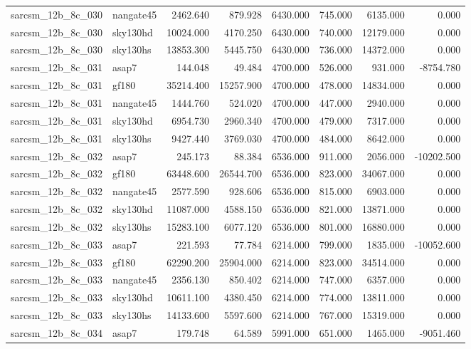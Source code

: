 \begin{tabular}{llrrrrrr}
sarcsm\_12b\_8c\_030 & nangate45 & 2462.640 & 879.928 & 6430.000 & 745.000 & 6135.000 & 0.000 \\
sarcsm\_12b\_8c\_030 & sky130hd & 10024.000 & 4170.250 & 6430.000 & 740.000 & 12179.000 & 0.000 \\
sarcsm\_12b\_8c\_030 & sky130hs & 13853.300 & 5445.750 & 6430.000 & 736.000 & 14372.000 & 0.000 \\
sarcsm\_12b\_8c\_031 & asap7 & 144.048 & 49.484 & 4700.000 & 526.000 & 931.000 & -8754.780 \\
sarcsm\_12b\_8c\_031 & gf180 & 35214.400 & 15257.900 & 4700.000 & 478.000 & 14834.000 & 0.000 \\
sarcsm\_12b\_8c\_031 & nangate45 & 1444.760 & 524.020 & 4700.000 & 447.000 & 2940.000 & 0.000 \\
sarcsm\_12b\_8c\_031 & sky130hd & 6954.730 & 2960.340 & 4700.000 & 479.000 & 7317.000 & 0.000 \\
sarcsm\_12b\_8c\_031 & sky130hs & 9427.440 & 3769.030 & 4700.000 & 484.000 & 8642.000 & 0.000 \\
sarcsm\_12b\_8c\_032 & asap7 & 245.173 & 88.384 & 6536.000 & 911.000 & 2056.000 & -10202.500 \\
sarcsm\_12b\_8c\_032 & gf180 & 63448.600 & 26544.700 & 6536.000 & 823.000 & 34067.000 & 0.000 \\
sarcsm\_12b\_8c\_032 & nangate45 & 2577.590 & 928.606 & 6536.000 & 815.000 & 6903.000 & 0.000 \\
sarcsm\_12b\_8c\_032 & sky130hd & 11087.000 & 4588.150 & 6536.000 & 821.000 & 13871.000 & 0.000 \\
sarcsm\_12b\_8c\_032 & sky130hs & 15283.100 & 6077.120 & 6536.000 & 801.000 & 16880.000 & 0.000 \\
sarcsm\_12b\_8c\_033 & asap7 & 221.593 & 77.784 & 6214.000 & 799.000 & 1835.000 & -10052.600 \\
sarcsm\_12b\_8c\_033 & gf180 & 62290.200 & 25904.000 & 6214.000 & 823.000 & 34514.000 & 0.000 \\
sarcsm\_12b\_8c\_033 & nangate45 & 2356.130 & 850.402 & 6214.000 & 747.000 & 6357.000 & 0.000 \\
sarcsm\_12b\_8c\_033 & sky130hd & 10611.100 & 4380.450 & 6214.000 & 774.000 & 13811.000 & 0.000 \\
sarcsm\_12b\_8c\_033 & sky130hs & 14133.600 & 5597.600 & 6214.000 & 767.000 & 15319.000 & 0.000 \\
sarcsm\_12b\_8c\_034 & asap7 & 179.748 & 64.589 & 5991.000 & 651.000 & 1465.000 & -9051.460 \\

\end{tabular}
